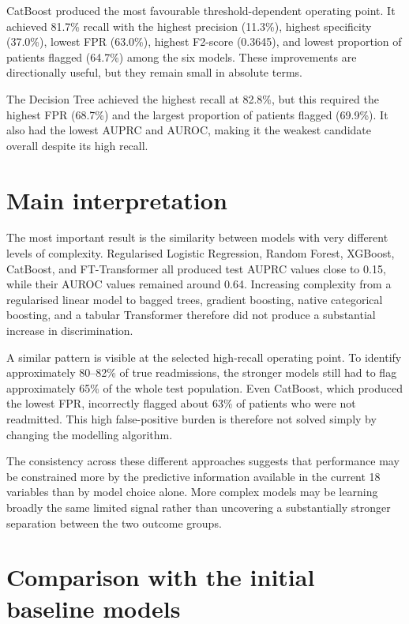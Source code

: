 \documentclass[11pt,a4paper]{article}
\begin{document}
CatBoost produced the most favourable threshold-dependent operating point. It achieved 81.7\% recall with the highest precision (11.3\%), highest specificity (37.0\%), lowest FPR (63.0\%), highest F2-score (0.3645), and lowest proportion of patients flagged (64.7\%) among the six models. These improvements are directionally useful, but they remain small in absolute terms.

The Decision Tree achieved the highest recall at 82.8\%, but this required the highest FPR (68.7\%) and the largest proportion of patients flagged (69.9\%). It also had the lowest AUPRC and AUROC, making it the weakest candidate overall despite its high recall.

\section{Main interpretation}

The most important result is the similarity between models with very different levels of complexity. Regularised Logistic Regression, Random Forest, XGBoost, CatBoost, and FT-Transformer all produced test AUPRC values close to 0.15, while their AUROC values remained around 0.64. Increasing complexity from a regularised linear model to bagged trees, gradient boosting, native categorical boosting, and a tabular Transformer therefore did not produce a substantial increase in discrimination.

A similar pattern is visible at the selected high-recall operating point. To identify approximately 80--82\% of true readmissions, the stronger models still had to flag approximately 65\% of the whole test population. Even CatBoost, which produced the lowest FPR, incorrectly flagged about 63\% of patients who were not readmitted. This high false-positive burden is therefore not solved simply by changing the modelling algorithm.

The consistency across these different approaches suggests that performance may be constrained more by the predictive information available in the current 18 variables than by model choice alone. More complex models may be learning broadly the same limited signal rather than uncovering a substantially stronger separation between the two outcome groups.

\section{Comparison with the initial baseline models}
\end{document}
